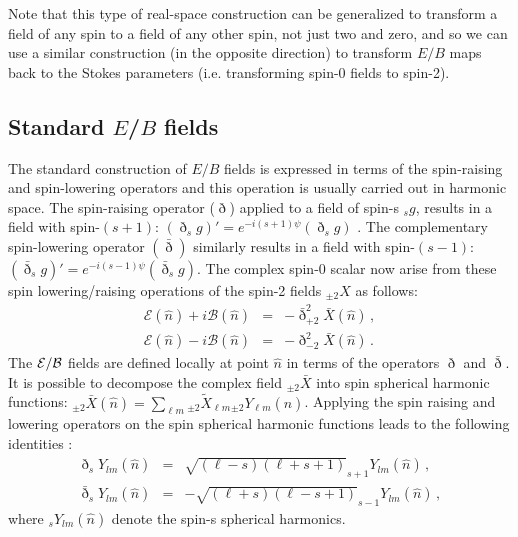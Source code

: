 \documentclass[a4paper,11pt]{article}
\newcommand{\beqry}{\begin{eqnarray}}
\newcommand{\eeqry}{\end{eqnarray}}
\begin{document}
Note that this type of real-space construction can be generalized to transform a field of any spin to a field of any other spin, not just two and zero, and so we can use a similar construction (in the opposite direction) to transform $E/B$ maps back to the Stokes parameters (i.e. transforming spin-0 fields to spin-2).

\subsection{Standard $E$/$B$ fields}


The standard construction of $E/B$ fields is expressed in terms of the spin-raising and spin-lowering operators and this operation is usually carried out in harmonic space. The spin-raising operator ($\eth$) applied to a field of spin-s $_{s}g$, results in a field with spin-$(s+1)$: $(\eth _{s}g)' = e^{-i(s+1)\psi}(\eth _{s}g)$  \cite{goldberg67}.  The complementary spin-lowering operator $(\bar{\eth})$  similarly results in a field with spin-$(s-1)$: $(\bar{\eth} _{s}g)' = e^{-i(s-1)\psi}(\bar{\eth} _{s}g)$.  The complex spin-0 scalar now arise from these spin lowering/raising operations of the spin-2 fields ${_{\pm 2}X}$ as follows:
%
\begin{subequations}\label{eq:ebdef}
\beqry
\mathcal{E}(\hat{n}) + i \mathcal{B}(\hat{n}) &=& -\bar{\eth}^2 _{+ 2}\bar{X}(\hat{n}) \,,\label{eq:ebdef_lower}\\
\mathcal{E}(\hat{n}) - i \mathcal{B}(\hat{n}) &=& -{\eth}^2 _{-2}\bar{X}(\hat{n}) \,.
\eeqry
\end{subequations}
%
The $\cal E/B$ fields are defined locally at point $\hat n$ in terms of the operators $\eth$ and $\bar \eth$. It is possible to decompose the complex field $_{\pm 2}\bar{X}$ into spin spherical harmonic functions: ${}_{\pm 2}\bar{X}(\hat{n}) = \sum_{\ell m} {}_{\pm 2} \tilde X_{\ell m} {}_{\pm 2}Y_{\ell m}(\hat{n})$. Applying the spin raising and lowering operators on the spin spherical harmonic functions leads to the following identities \cite{goldberg67}:
%
\begin{subequations}\label{eq:spinopylm} 
\beqry
\eth _s Y_{lm}(\hat{n}) &=& \sqrt{(\ell-s)(\ell+s+1)} _{s+1} Y_{lm}(\hat{n}) \,, \\
\bar{\eth} _s Y_{lm}(\hat{n}) &=& -\sqrt{(\ell+s)(\ell-s+1)} _{s-1} Y_{lm}(\hat{n}) \,, 
\eeqry
\end{subequations}
%
where $_s Y_{lm}(\hat{n}) $ denote the spin-s spherical harmonics.
\end{document}
